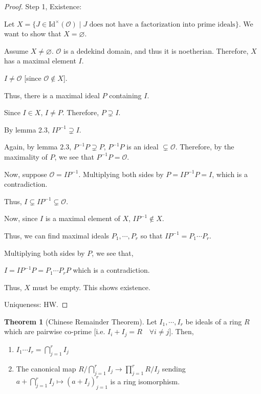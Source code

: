 \documentclass[openany]{amsbook}
\numberwithin{section}{chapter}
\theoremstyle{definition}
\newtheorem{theorem}{Theorem}[chapter]
\begin{document}
\begin{proof}

    Step 1, Existence:

    Let \(X = \{ J \in \operatorname{Id^\times }(\mathcal{O}) \mid J \text{ does not have a factorization into prime ideals} \} \). We want to show that \(X = \varnothing\).

    Assume \(X \neq \varnothing\). \(\mathcal{O}\) is a dedekind domain, and thus it is noetherian. Therefore, \(X\) has a maximal element \(I\).

    \(I \neq \mathcal{O}\) [since \(\mathcal{O} \notin X\)].

    Thus, there is a maximal ideal \(P\) containing \(I\).

    Since \(I\in X\), \(I \neq P\). Therefore, \(P\supsetneq I\).

    By lemma 2.3, \(I P ^{-1} \supsetneq I\).

    Again, by lemma \(2.3\), \(P ^{-1} P \supsetneq P\), \(P ^{-1} P\) is an ideal \(\subsetneq \mathcal{O}\). Therefore, by the maximality of \(P\), we see that \(P ^{-1} P = \mathcal{O}\).
    
    Now, suppose \(\mathcal{O} = I P ^{-1} \). Multiplying both sides by \(P = I P ^{-1} P = I\), which is a contradiction.
    
    Thus, \(I \subsetneq I P ^{-1} \subsetneq \mathcal{O}\).

    Now, since \(I\) is a maximal element of \(X\), \(I P ^{-1} \notin X\).

    Thus, we can find maximal ideals \(P_1, \cdots , P_r\) so that \(I P ^{-1} = P_1 \cdots P_r\).

    Multiplying both sides by \(P\), we see that,

    \(I = I P ^{-1} P = P_1 \cdots P_r P \) which is a contradiction.

    Thus, \(X\) must be empty. This shows existence.

    Uniqueness: HW.

\end{proof}

\begin{theorem}
    [Chinese Remainder Theorem]

    Let \(I_1, \cdots , I_r\) be ideals of a ring \(R\) which are pairwise co-prime [i.e. \(I_i + I_j = R \quad \forall i \neq j\)]. Then,
    
    \begin{enumerate}[label=\roman*)]
        \item \(I_1 \cdots I_r = \bigcap_{j=1}^{r} I_j\)  
        \item The canonical map \(R / \bigcap_{j=1}^{r} I_j \to \prod_{j=1}^{r} R / I_j\) sending \(a + \bigcap_{j=1}^{r} I_j \mapsto (a + I_j)^r_{j=1}\) is a ring isomorphism.
    \end{enumerate} 

\end{theorem}
\end{document}
